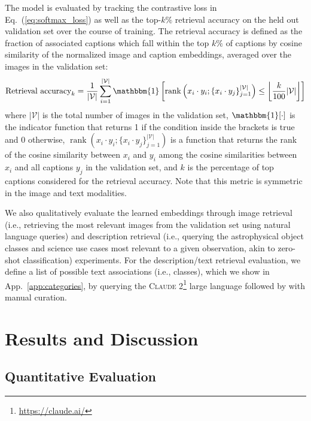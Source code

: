 \documentclass[10pt]{article} %
\newcommand{\eqrefb}[1]{(\ref{#1})}
\begin{document}
The model is evaluated by tracking the contrastive loss in Eq.~\eqrefb{eq:softmax_loss} as well as the top-$k\%$ retrieval accuracy on the held out validation set over the course of training.
%
The retrieval accuracy is defined as the fraction of associated captions which fall within the top $k\%$ of captions by cosine similarity of the normalized image and caption embeddings, averaged over the images in the validation set:
\begin{equation}
\text{Retrieval accuracy}_k = \frac{1}{|\mathcal V|} \sum_{i=1}^{|\mathcal V|} \mathbbm{1}\left[\operatorname{rank}\left({x}_i \cdot {y}_{i}; \{{x}_i \cdot {y}_{j}\}_{j=1}^{|\mathcal V|}\right) \leq \left\lfloor\frac{k}{100}|\mathcal V|\right\rfloor\right]
\label{eq:retrieval_accuracy}
\end{equation}
where $|\mathcal V|$ is the total number of images in the validation set, $\mathbbm{1}[\cdot]$ is the indicator function that returns 1 if the condition inside the brackets is true and 0 otherwise, $\operatorname{rank}\left({x}_i \cdot {y}_{i}; \{{x}_i \cdot {y}_{j}\}_{j=1}^{|\mathcal V|}\right)$ is a function that returns the rank of the cosine similarity between ${x}_i$ and ${y}_{i}$ among the cosine similarities between ${x}_i$ and all captions ${y}_j$ in the validation set, and $k$ is the percentage of top captions considered for the retrieval accuracy. Note that this metric is symmetric in the image and text modalities.

We also qualitatively evaluate the learned embeddings through image retrieval (i.e., retrieving the most relevant images from the validation set using natural language queries) and description retrieval (i.e., querying the astrophysical object classes and science use cases most relevant to a given observation, akin to zero-shot classification) experiments. 
%
For the description/text retrieval evaluation, we define a list of possible text associations (i.e., classes), which we show in App.~\ref{app:categories}, by querying the \textsc{Claude 2}\footnote{\url{https://claude.ai/}} large language followed by with manual curation.

\section{Results and Discussion}
\label{sec:results}

\subsection{Quantitative Evaluation}
\end{document}
